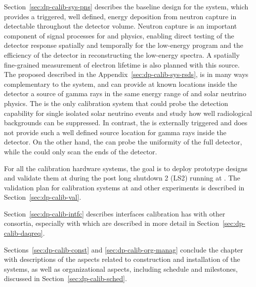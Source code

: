 Section~\ref{sec:dp-calib-sys-pns} describes the baseline design for the  system, which provides a triggered, well defined, energy deposition from neutron capture in \lar detectable throughout the detector volume. Neutron capture is an important component of signal processes for  and  physics, enabling direct testing of the detector response spatially and temporally for the low-energy program and the efficiency of the detector in reconstructing the low-energy spectra. A spatially fine-grained measurement of electron lifetime is also planned with this source.
The proposed  described in the Appendix~\ref{sec:dp-calib-sys-rsds}, 
is in many ways complementary to the 
system, and can provide at known locations inside the detector a source of gamma rays in the same energy range of  and solar neutrino physics. %
The  is the only calibration system that could probe the detection capability for single isolated solar neutrino events and study how well radiological backgrounds can be suppressed. In contrast, the  is externally triggered and does not provide such a well defined source location for gamma rays inside the detector. On the other hand, the  can probe the uniformity of the full detector, while the  could only scan the ends of the detector. %

For all the calibration hardware systems, the goal is to deploy prototype designs and validate them at  during the post long shutdown 2 (LS2) running  at . The validation plan for calibration systems at  and other experiments is described in Section~\ref{sec:dp-calib-val}. 

Section~\ref{sec:dp-calib-intfc} describes interfaces calibration has with other  consortia, especially  with  which are described in more detail in Section~\ref{sec:dp-calib-daqreq}. 

Sections~\ref{sec:dp-calib-const} and \ref{sec:dp-calib-org-manag} conclude the chapter with descriptions of the aspects related to construction and installation of the systems, as well as organizational aspects, including schedule and milestones, discussed in Section~\ref{sec:dp-calib-sched}.

